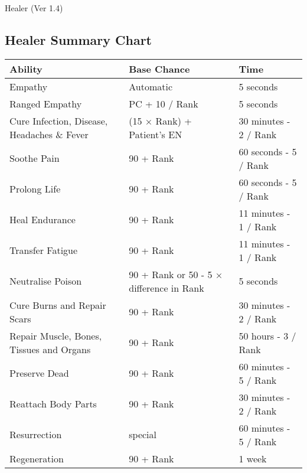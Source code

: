 \begin{Chapter}{Healer (Ver 1.4)}
\begin{table*}[t]
\section{Healer Summary Chart}

\medskip

\begin{tabularx}{\linewidth}{|X|X|X|} \hline
Ability						& Base Chance			& Time \\ \hline
Empathy						& Automatic			& 5 seconds \\
Ranged Empathy					& PC + 10 / Rank		& 5 seconds \\
Cure Infection, Disease, Headaches \& Fever	& (15 × Rank) + Patient’s EN	& 30 minutes - 2 / Rank \\
Soothe Pain					& 90 + Rank			& 60 seconds - 5 / Rank \\
Prolong Life					& 90 + Rank			& 60 seconds - 5 / Rank \\
Heal Endurance					& 90 + Rank			& 11 minutes - 1 / Rank \\
Transfer Fatigue				& 90 + Rank			& 11 minutes - 1 / Rank \\
Neutralise Poison				& 90 + Rank or 50 - 5 × difference in Rank	& 5 seconds \\
Cure Burns and Repair Scars			& 90 + Rank			& 30 minutes - 2 / Rank \\
Repair Muscle, Bones, Tissues and Organs	& 90 + Rank			& 50 hours - 3 / Rank \\
Preserve Dead					& 90 + Rank			& 60 minutes - 5 / Rank \\
Reattach Body Parts				& 90 + Rank 			& 30 minutes - 2 / Rank \\
Resurrection					& special			& 60 minutes - 5 / Rank \\
Regeneration					& 90 + Rank			& 1 week \\ \hline
\end{tabularx}

\end{table*}

\end{Chapter}
